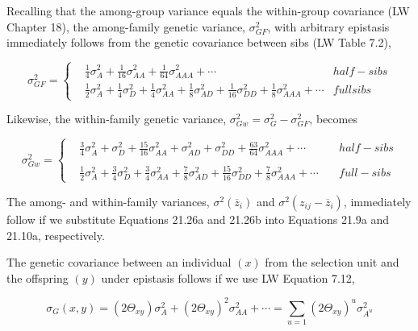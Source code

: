 \documentclass{article}
\begin{document}
Recalling that the among-group variance equals the within-group covariance (LW Chapter 18), the among-family genetic variance,  $ \sigma_{GF}^{2} $, with arbitrary epistasis immediately follows from the genetic covariance between sibs (LW Table 7.2),

\begin{equation}
\sigma_{GF}^{2}=\left\{\begin{aligned}&\frac{1}{4}\sigma_{A}^{2}+\frac{1}{16}\sigma_{AA}^{2}+\frac{1}{64}\sigma_{AAA}^{2}+\cdots&half-sibs\\&\frac{1}{2}\sigma_{A}^{2}+\frac{1}{4}\sigma_{D}^{2}+\frac{1}{4}\sigma_{AA}^{2}+\frac{1}{8}\sigma_{AD}^{2}+\frac{1}{16}\sigma_{DD}^{2}+\frac{1}{8}\sigma_{AAA}^{2}+\cdots&full sibs\end{aligned}\right.
\tag{21.26a}
\label{eq:21_26a}
\end{equation}

Likewise, the within-family genetic variance,  $ \sigma_{Gw}^{2} = \sigma_{G}^{2} - \sigma_{GF}^{2} $, becomes

\begin{equation}
\sigma_{Gw}^{2}=\left\{\begin{aligned}&\frac{3}{4}\sigma_{A}^{2}+\sigma_{D}^{2}+\frac{15}{16}\sigma_{AA}^{2}+\sigma_{AD}^{2}+\sigma_{DD}^{2}+\frac{63}{64}\sigma_{AAA}^{2}+\cdots&\quad half-sibs\\ &\\ &\frac{1}{2}\sigma_{A}^{2}+\frac{3}{4}\sigma_{D}^{2}+\frac{3}{4}\sigma_{AA}^{2}+\frac{7}{8}\sigma_{AD}^{2}+\frac{15}{16}\sigma_{DD}^{2}+\frac{7}{8}\sigma_{AAA}^{2}+\cdots&\quad full-sibs\end{aligned}\right.
\tag{21.26b}
\label{eq:21_26b}
\end{equation}

The among- and within-family variances,  $ \sigma^2(\overline{z}_i) $ and  $ \sigma^2(z_{ij} - \overline{z}_i) $, immediately follow if we substitute Equations 21.26a and 21.26b into Equations 21.9a and 21.10a, respectively.

The genetic covariance between an individual  $ (x) $ from the selection unit and the offspring  $ (y) $ under epistasis follows if we use LW Equation 7.12,

\begin{equation}
\sigma_{G}(x,y)=\left(2\Theta_{xy}\right)\sigma_{A}^{2}+\left(2\Theta_{xy}\right)^{2}\sigma_{AA}^{2}+\cdots=\sum_{u=1}\left(2\Theta_{xy}\right)^{u}\sigma_{A^{u}}^{2}
\end{equation}
\end{document}
